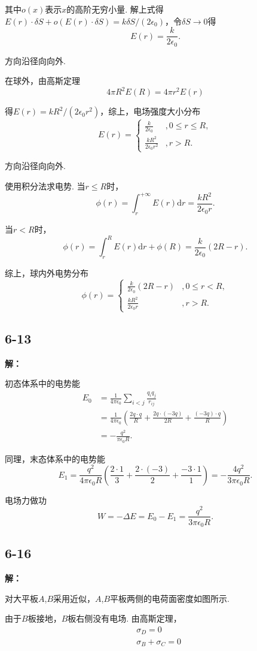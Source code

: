 \documentclass[twocolumn]{ctexart}
\newcommand{\sol}[1]{\subsection*{#1}\noindent\textbf{解：}
	
}
\begin{document}
	其中$o(x)$表示$x$的高阶无穷小量. 解上式得$E(r)\cdot\delta S+o\left(E(r)\cdot\delta S\right)=k\delta S/(2\epsilon_0)$，令$\delta S\to0$得
	$$E(r)=\frac{k}{2\epsilon_0}.$$
	
	方向沿径向向外.
	
	在球外，由高斯定理
	$$4\pi R^2E(R)=4\pi r^2E(r)$$
	
	得$E(r)=kR^2/\left(2\epsilon_0r^2\right)$，综上，电场强度大小分布
	$$E(r)=\left\{
	\begin{array}{ll}
		\displaystyle{\frac{k}{2\epsilon_0}} &,0\leq r\leq R,\\
		\displaystyle{\frac{kR^2}{2\epsilon_0r^2}} &,r>R.
	\end{array}\right.$$

	方向沿径向向外.
	
	使用积分法求电势. 当$r\leq R$时，
	$$\phi(r)=\int_{r}^{+\infty}E(r)\mathrm{d}r=\frac{kR^2}{2\epsilon_0r}.$$
	
	当$r<R$时，
	$$\phi(r)=\int_{r}^{R}E(r)\mathrm{d}r+\phi(R)=\frac{k}{2\epsilon_0}(2R-r).$$
	
	综上，球内外电势分布
	$$\phi(r)=\left\{
	\begin{array}{ll}
		\displaystyle{\frac{k}{2\epsilon_0}(2R-r)} &,0\leq r<R,\\
		\displaystyle{\frac{kR^2}{2\epsilon_0r}} &,r>R.
	\end{array}\right.$$

	\sol{6-13}
	初态体系中的电势能
	\begin{align*}
		E_0&=\frac{1}{4\pi\epsilon_0}\sum_{i<j}\frac{q_iq_j}{r_{ij}}\\
		&=\frac{1}{4\pi\epsilon_0}\left(\frac{2q\cdot q}{R}+\frac{2q\cdot(-3q)}{2R}+\frac{(-3q)\cdot q}{R}\right)\\
		&=-\frac{q^2}{\pi\epsilon_0R}.
	\end{align*}
	
	同理，末态体系中的电势能
	$$E_1=\frac{q^2}{4\pi\epsilon_0R}\left(\frac{2\cdot1}{3}+\frac{2\cdot(-3)}{2}+\frac{-3\cdot1}{1}\right)=-\frac{4q^2}{3\pi\epsilon_0R}.$$
	
	电场力做功
	$$W=-\Delta E=E_0-E_1=\frac{q^2}{3\pi\epsilon_0R}.$$
	
	\sol{6-16}
	对大平板$A$,$B$采用近似，$A$,$B$平板两侧的电荷面密度如图所示.
	
	由于$B$板接地，$B$板右侧没有电场. 由高斯定理，
	\begin{align}
		&\sigma_D=0\\
		&\sigma_B+\sigma_C=0
	\end{align}
	
\end{document}
